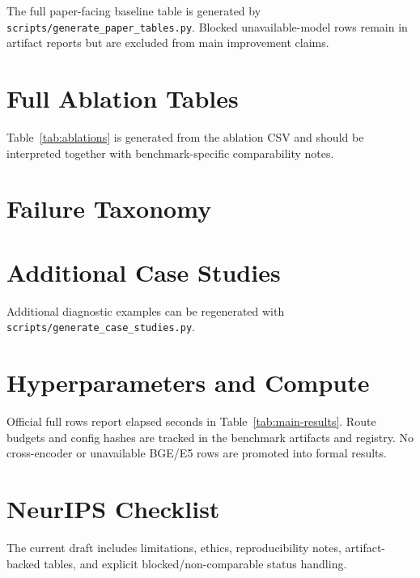 \documentclass[10pt]{article}
\newcommand{\artifact}[1]{\texttt{\small #1}}
\begin{document}
The full paper-facing baseline table is generated by
\artifact{scripts/generate\_paper\_tables.py}. Blocked unavailable-model rows
remain in artifact reports but are excluded from main improvement claims.

\section{Full Ablation Tables}

Table~\ref{tab:ablations} is generated from the ablation CSV and should be
interpreted together with benchmark-specific comparability notes.

\section{Failure Taxonomy}

\begin{table}[h]
  \centering
  \caption{Failure taxonomy artifact rows.}
  
\end{table}

\section{Additional Case Studies}

Additional diagnostic examples can be regenerated with
\artifact{scripts/generate\_case\_studies.py}.

\section{Hyperparameters and Compute}

Official full rows report elapsed seconds in Table~\ref{tab:main-results}.
Route budgets and config hashes are tracked in the benchmark artifacts and
registry. No cross-encoder or unavailable BGE/E5 rows are promoted into formal
results.

\section{NeurIPS Checklist}

The current draft includes limitations, ethics, reproducibility notes,
artifact-backed tables, and explicit blocked/non-comparable status handling.



\end{document}
